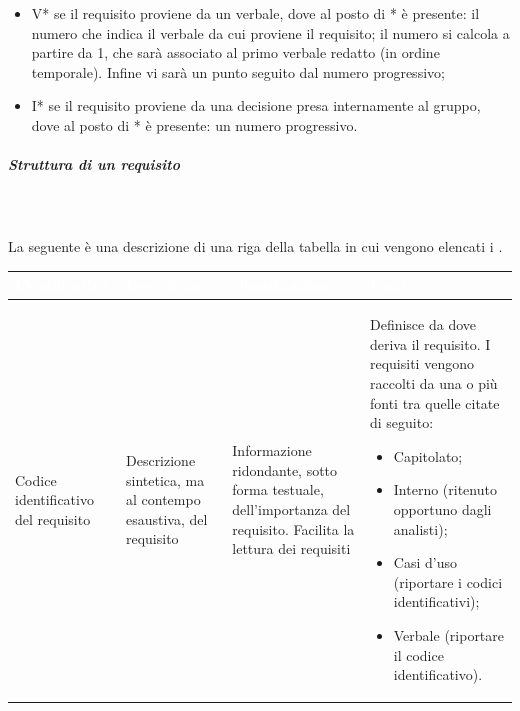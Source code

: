 \begin{itemize}
\begin{itemize}
		\item V* se il requisito proviene da un verbale, dove al posto di * è presente: il numero che indica il verbale da cui proviene il requisito; il numero si calcola a partire da 1, che sarà associato al primo verbale redatto (in ordine temporale). Infine vi sarà un punto seguito dal numero progressivo;
		\item I* se il requisito proviene da una decisione presa internamente al gruppo, dove al posto di * è presente: un numero progressivo.
	\end{itemize}
\end{itemize}

\subparagraph*{Struttura di un requisito}\mbox{}\\ \\
La seguente è una descrizione di una riga della tabella in cui vengono elencati i .

{
\renewcommand{\arraystretch}{1.5}
\centering
\begin{longtable}{C{3cm} C{3.2cm} C{4.3cm} C{4.3cm}}
\textcolor{white}{\textbf{Identificativo}} &
\textcolor{white}{\textbf{Descrizione}} &
\textcolor{white}{\textbf{Classificazione}} &
\textcolor{white}{\textbf{Fonti}} \\
\endhead
Codice identificativo del requisito &
Descrizione sintetica, ma al contempo esaustiva, del requisito &
Informazione ridondante, sotto forma testuale, dell’importanza del requisito. Facilita la lettura dei requisiti &
Definisce da dove deriva il requisito. I requisiti vengono raccolti da una o più fonti tra quelle citate di seguito:
\begin{itemize}
	\item Capitolato;
	\item Interno (ritenuto opportuno dagli analisti);
	\item Casi d'uso (riportare i codici identificativi);
	\item Verbale (riportare il codice identificativo).
\end{itemize} \\
\end{longtable}
}
